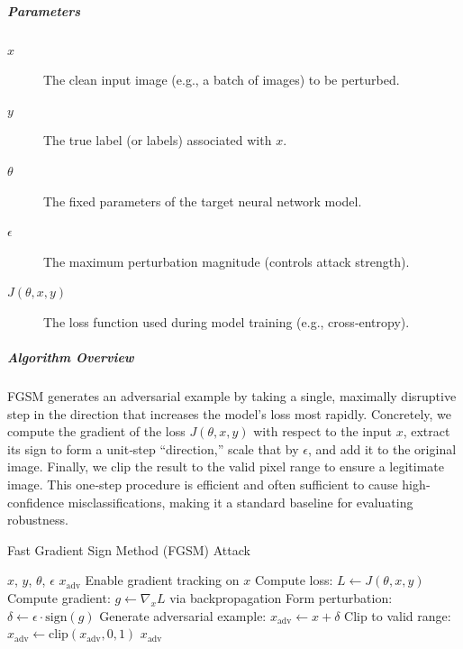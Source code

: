 \documentclass[../main.tex]{subfiles}
\begin{document}
\subparagraph{Parameters}
\begin{description}
  \item[$x$] The clean input image (e.g., a batch of images) to be perturbed.
  \item[$y$] The true label (or labels) associated with $x$.
  \item[$\theta$] The fixed parameters of the target neural network model.
  \item[$\epsilon$] The maximum perturbation magnitude (controls attack strength).
  \item[$J(\theta, x, y)$] The loss function used during model training (e.g., cross‐entropy).
\end{description}

\subparagraph{Algorithm Overview}
FGSM generates an adversarial example by taking a single, maximally disruptive step in the direction that increases the model’s loss most rapidly. Concretely, we compute the gradient of the loss $J(\theta, x, y)$ with respect to the input $x$, extract its sign to form a unit‐step “direction,” scale that by $\epsilon$, and add it to the original image. Finally, we clip the result to the valid pixel range to ensure a legitimate image. This one‐step procedure is efficient and often sufficient to cause high‐confidence misclassifications, making it a standard baseline for evaluating robustness.

\begin{breakablealgorithm}{Fast Gradient Sign Method (FGSM) Attack}
\begin{algorithmic}[1]
\Require $x$, $y$, $\theta$, $\epsilon$
\Ensure $x_{\mathrm{adv}}$
\State Enable gradient tracking on $x$ 
\State Compute loss: $L \gets J(\theta, x, y)$
\State Compute gradient: $g \gets \nabla_x L$ via backpropagation
\State Form perturbation: $\delta \gets \epsilon \cdot \mathrm{sign}(g)$
\State Generate adversarial example: $x_{\mathrm{adv}} \gets x + \delta$
\State Clip to valid range: $x_{\mathrm{adv}} \gets \mathrm{clip}(x_{\mathrm{adv}}, 0, 1)$
\State \Return $x_{\mathrm{adv}}$
\end{algorithmic}
\end{breakablealgorithm}
\end{document}
